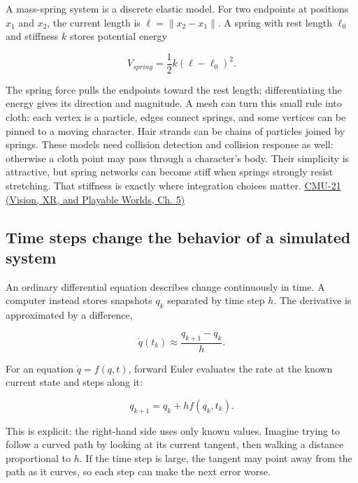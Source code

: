 A mass-spring system is a discrete elastic model. For two endpoints at positions \(x_1\) and \(x_2\), the current length is \(\ell=\|x_2-x_1\|\). A spring with rest length \(\ell_0\) and stiffness \(k\) stores potential energy

\[
V_{spring}=\frac12 k(\ell-\ell_0)^2.
\]

The spring force pulls the endpoints toward the rest length; differentiating the energy gives its direction and magnitude. A mesh can turn this small rule into cloth: each vertex is a particle, edges connect springs, and some vertices can be pinned to a moving character. Hair strands can be chains of particles joined by springs. These models need collision detection and collision response as well: otherwise a cloth point may pass through a character's body. Their simplicity is attractive, but spring networks can become stiff when springs strongly resist stretching. That stiffness is exactly where integration choices matter. \href{../07-Vision-XR-and-Playable-Worlds/main.pdf\#nameddest=04-visual-computing-ii-ch036-cmu-21---dynamics-and-time-integration}{CMU-21 (Vision, XR, and Playable Worlds, Ch. 5)}

\subsection{Time steps change the behavior of a simulated system}\label{04-visual-computing-ii-ch029-time-steps-change-the-behavior-of-a-simulated-system}

\hypertarget{04-visual-computing-ii-ch029-time-steps-change-the-behavior-of-a-simulated-system}{}

An ordinary differential equation describes change continuously in time. A computer instead stores snapshots \(q_k\) separated by time step \(h\). The derivative is approximated by a difference,

\[
\dot q(t_k)\approx\frac{q_{k+1}-q_k}{h}.
\]

For an equation \(\dot q=f(q,t)\), forward Euler evaluates the rate at the known current state and steps along it:

\[
q_{k+1}=q_k+h f(q_k,t_k).
\]

This is explicit: the right-hand side uses only known values. Imagine trying to follow a curved path by looking at its current tangent, then walking a distance proportional to \(h\). If the time step is large, the tangent may point away from the path as it curves, so each step can make the next error worse.

